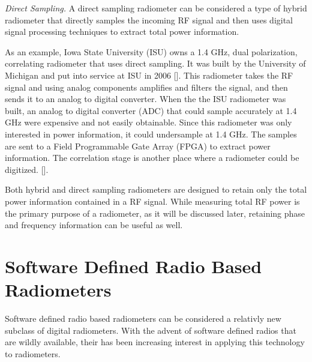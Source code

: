 \emph{Direct Sampling.}  A direct sampling radiometer can be considered a type of hybrid radiometer that directly samples the incoming RF signal and then uses digital signal processing techniques to extract total power information. 
  
As an example, Iowa State University (ISU) owns a 1.4 GHz, dual polarization, correlating radiometer that uses direct sampling.  It was built by the University of Michigan and put into service at ISU in 2006 [\cite{Erbas}].  This radiometer takes the RF signal and using analog components amplifies and filters the signal, and then sends it to an analog to digital converter.  When the  the ISU radiometer was built, an analog to digital converter (ADC) that could sample accurately at 1.4 GHz were expensive and not easily obtainable.  Since this radiometer was only interested in power information, it could undersample at 1.4 GHz.  The samples are sent to a Field Programmable Gate Array (FPGA) to extract power information.  The correlation stage is another place where a radiometer could be digitized.  [\cite{Fischman2001}]. 

Both hybrid and direct sampling radiometers are designed to retain only the total power information contained in a RF signal.  While measuring total RF power is the primary purpose of a radiometer, as it will be discussed later, retaining phase and frequency information can be useful as well.

\section{Software Defined Radio Based Radiometers}

Software defined radio based radiometers can be considered a relativly new subclass of digital radiometers.  With the advent of software defined radios that are wildly available, their has been increasing interest in applying this technology to radiometers.


